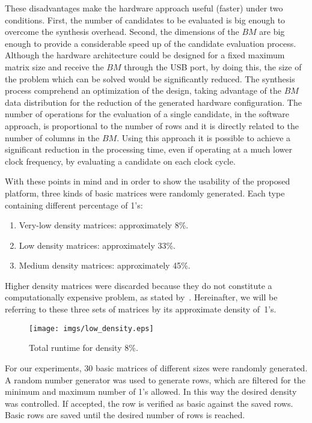 \documentclass[letterpaper, twoside, openright, 12pt]{book}%
\begin{document}
	These disadvantages make the hardware approach useful (faster) under two conditions. First, the number of candidates to be evaluated is big enough to overcome the synthesis overhead. Second, the dimensions of the $BM$ are big enough to provide a considerable speed up of the candidate evaluation process. Although the hardware architecture could be designed for a fixed maximum matrix size and receive the $BM$ through the USB port, by doing this, the size of the problem which can be solved would be significantly reduced. The synthesis process comprehend an optimization of the design, taking advantage of the $BM$ data distribution for the reduction of the generated hardware configuration. The number of operations for the evaluation of a single candidate, in the software approach, is proportional to the number of rows and it is directly related to the number of columns in the $BM$. Using this approach it is possible to achieve a significant reduction in the processing time, even if operating at a much lower clock frequency, by evaluating a candidate on each clock cycle.
	
	With these points in mind and in order to show the usability of the proposed platform, three kinds of basic matrices were randomly generated. Each type containing different percentage of 1's: 
	\begin{enumerate}
		\item Very-low density matrices: approximately 8\%.
		\item Low density matrices: approximately 33\%.
		\item Medium density matrices: approximately 45\%.
	\end{enumerate}
	
	Higher density matrices were discarded because they do not constitute a computationally expensive problem, as stated by~\cite{Rojas12}. Hereinafter, we will be referring to these three sets of matrices by its approximate density of~1's.
	
	
	\begin{figure}[htb]
	  \centering
	   \texttt{[image: imgs/low\_density.eps]}
	  \caption{Total runtime for density 8\%.}
	  \label{fig:result1}
	\end{figure}
	
	For our experiments, 30 basic matrices of different sizes were randomly generated. A random number generator was used to generate rows, which are filtered for the minimum and maximum number of 1's allowed. In this way the desired density was controlled. If accepted, the row is verified as basic against the saved rows. Basic rows are saved until the desired number of rows is reached. 
	
\end{document}
